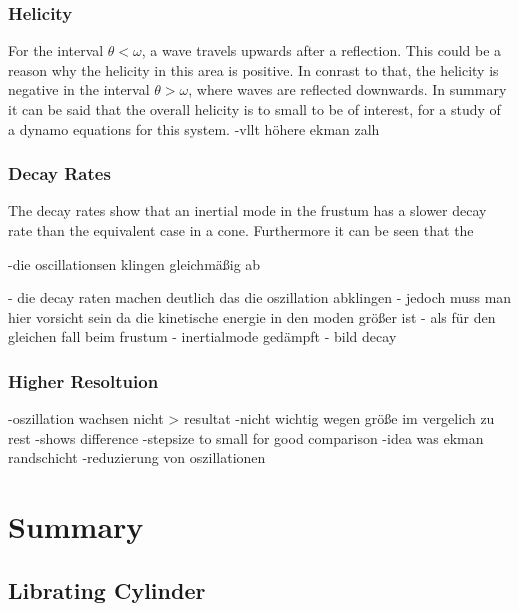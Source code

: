 \subsubsection{Helicity}

For the interval $\theta <\omega$, a wave travels upwards after a reflection.
This could be a reason why the helicity in this area is positive.
In conrast to that, the helicity is negative
in the interval $\theta >\omega$, where waves are reflected downwards.
In summary it can be said that the overall helicity is to
small to be of interest, for a study of a dynamo equations for this system.
-vllt höhere ekman zalh

\subsubsection{Decay Rates}

The decay rates show that an inertial mode in the frustum has a slower decay rate
than the equivalent  case in a cone.
Furthermore it can be seen that the

-die oscillationsen klingen gleichmäßig ab


- die decay raten machen deutlich das  die oszillation abklingen
- jedoch muss man hier vorsicht sein da die kinetische energie in den moden größer ist
- als für den gleichen fall beim frustum
- inertialmode gedämpft
- bild decay

\subsubsection{Higher Resoltuion}

-oszillation wachsen nicht > resultat
-nicht wichtig wegen größe im vergelich zu rest
-shows difference
-stepsize to small for good comparison
-idea was ekman randschicht
-reduzierung von oszillationen

\clearpage

\section{Summary}

\subsection{Librating Cylinder}


